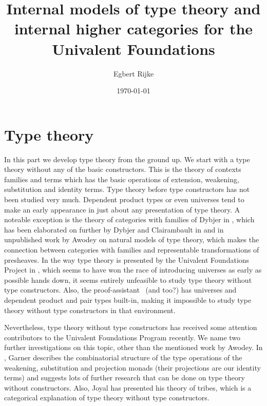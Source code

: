\documentclass{article}
\title{Internal models of type theory and internal higher categories for the
Univalent Foundations}
\author{Egbert Rijke}
\date{\today}
\begin{document}
\maketitle

\tableofcontents



\part{Type theory}

In this part we develop type theory from the ground up. We start with a type
theory without any of the basic constructors. This is the theory of contexts
families and terms which has the basic operations of extension, weakening,
substitution and identity terms. Type theory before type constructors has not
been studied very much. Dependent product types or even universes tend to make
an early appearance in just about any presentation of type theory.
A noteable exception is the theory of categories with families of Dybjer
in \cite{Dybjer1996}, which has been elaborated on further by Dybjer and
Clairambault in \cite{DybjerClairambault2011} and in unpublished work by
Awodey \cite{Awodey2013} on natural models of type theory,
which makes the connection between categories with families and representable
transformations of presheaves. In the way type theory is presented by the
Univalent Foundations Project in \cite{TheBook}, which seems to have won the race of introducing universes
as early as possible hands down, it seems entirely unfeasible to study type
theory without type constructors. Also, the 
proof-assistant \Coq\ {\color{red}(and \Agda too?)} has universes and dependent product and pair types 
built-in, making it impossible to study type theory without type constructors in 
that environment.

Nevertheless, type theory without type constructors has received some attention
contributors to the Univalent Foundations Program recently. We name two
further investigations on this topic, other than the mentioned work by Awodey.
In \cite{Garner2014}, Garner describes the combinatorial structure
of the type operations of the weakening, substitution and projection monads
(their projections are our identity terms) and suggests lots of further research
that can be done on type theory without constructors. Also, Joyal has presented
his theory of tribes, which is a categorical explanation of type theory
without type constructors.
\end{document}
